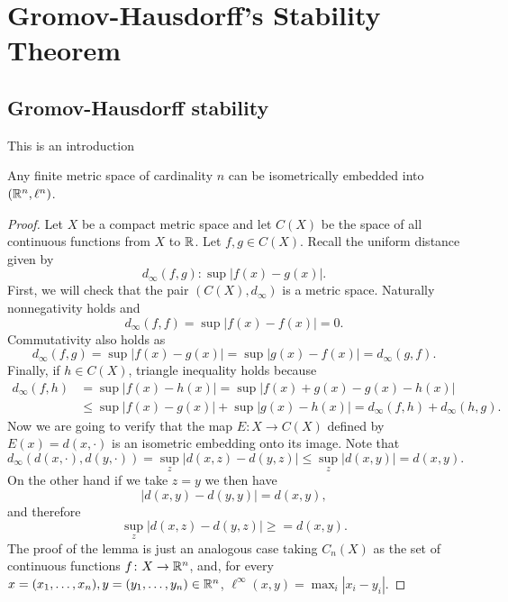 \chapter{Gromov-Hausdorff's Stability Theorem} \label{chapter:gromov-hausdorf-stability}
\section{Gromov-Hausdorff stability}

This is an introduction

\begin{lemma} \label{lemma:haus-aux-1}
    Any finite metric space of cardinality $ n $ can be isometrically embedded into $(\mathbb R^n, \ell^n)$.
\end{lemma}
\begin{proof}
    Let $ X $ be a compact metric space and let $ C(X) $ be the space of all continuous functions from $ X $ to $ \mathbb R $. Let $ f, g \in C(X) $. Recall the uniform distance given by
    \begin{equation}
        d_\infty(f, g) \colon \sup | f(x) - g(x) |.
    \end{equation}
    First, we will check that the pair $ (C(X), d_\infty) $ is a metric space. Naturally nonnegativity holds and 
    \begin{equation}
        d_\infty(f, f) = \sup | f(x) - f(x) | = 0.
    \end{equation}
    Commutativity also holds as 
    \begin{equation}
        d_\infty(f, g) = \sup | f(x) - g(x) | = \sup | g(x) - f(x) | = d_\infty(g, f).
    \end{equation}
    Finally, if $ h \in C(X) $, triangle inequality holds because
    \begin{align}
        d_\infty(f, h) &= \sup | f(x) - h(x) | = \sup | f(x) + g(x) - g(x) - h(x) | \\
        &\leq \sup | f(x)- g(x) | + \sup | g(x) - h(x) | = d_\infty(f, h) + d_\infty(h, g).
    \end{align}
    Now we are going to verify that the map $ E \colon X \to C(X) $ defined by $ E(x) = d(x, \cdot) $ is an isometric embedding onto its image. Note that
    \begin{equation}
        d_\infty(d(x, \cdot), d(y, \cdot)) = \sup_z |d(x, z) - d(y, z)| \leq  \sup_z |d(x, y)| = d(x, y).
    \end{equation}
    On the other hand if we take $ z = y $ we then have
    \begin{equation}
        |d(x, y) - d(y, y)| = d(x, y),
    \end{equation}
    and therefore
    \begin{equation}
        \sup_z |d(x, z) - d(y, z)| \geq = d(x, y).
    \end{equation}
    The proof of the lemma is just an analogous case taking $ C_n(X) $ as the set of continuous functions $ f \colon X \to \mathbb R^n $, and, for every $ x = (x_1, \dots, x_n), y = (y_1, \dots, y_n) \in \mathbb R^n $, $ \ell^\infty(x, y) = \max_i |x_i - y_i|$.
\end{proof}

